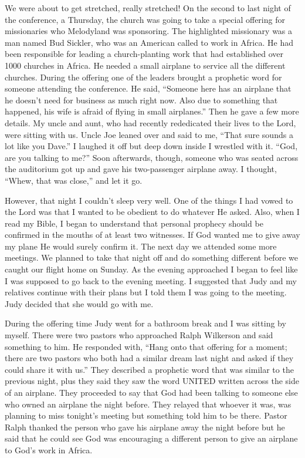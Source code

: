 \documentclass[twoside, 12pt]{book}
\begin{document}
We were about to get stretched, really stretched! On the second to last night of the conference, a Thursday, the church was going to take a special offering for missionaries who Melodyland was sponsoring. The highlighted missionary was a man named Bud Sickler, who was an American called to work in Africa. He had been responsible for leading a church-planting work that had established over 1000 churches in Africa. He needed a small airplane to service all the different churches. During the offering one of the leaders brought a prophetic word for someone attending the conference. He said, “Someone here has an airplane that he doesn't need for business as much right now. Also due to something that happened, his wife is afraid of flying in small airplanes.” Then he gave a few more details. My uncle and aunt, who had recently rededicated their lives to the Lord, were sitting with us. Uncle Joe leaned over and said to me, “That sure sounds a lot like you Dave.” I laughed it off but deep down inside I wrestled with it. “God, are you talking to me?” Soon afterwards, though, someone who was seated across the auditorium got up and gave his two-passenger airplane away. I thought, “Whew, that was close,” and let it go.

However, that night I couldn't sleep very well. One of the things I had vowed to the Lord was that I wanted to be obedient to do whatever He asked. Also, when I read my Bible, I began to understand that personal prophecy should be confirmed in the mouths of at least two witnesses. If God wanted me to give away my plane He would surely confirm it. The next day we attended some more meetings. We planned to take that night off and do something different before we caught our flight home on Sunday. As the evening approached I began to feel like I was supposed to go back to the evening meeting. I suggested that Judy and my relatives continue with their plans but I told them I was going to the meeting. Judy decided that she would go with me. 

During the offering time Judy went for a bathroom break and I was sitting by myself. There were two pastors who approached Ralph Wilkerson and said something to him. He responded with, “Hang onto that offering for a moment; there are two pastors who both had a similar dream last night and asked if they could share it with us.” They described a prophetic word that was similar to the previous night, plus they said they saw the word UNITED written across the side of an airplane. They proceeded to say that God had been talking to someone else who owned an airplane the night before. They relayed that whoever it was, was planning to miss tonight’s meeting but something told him to be there. Pastor Ralph thanked the person who gave his airplane away the night before but he said that he could see God was encouraging a different person to give an airplane to God’s work in Africa. 
\end{document}
